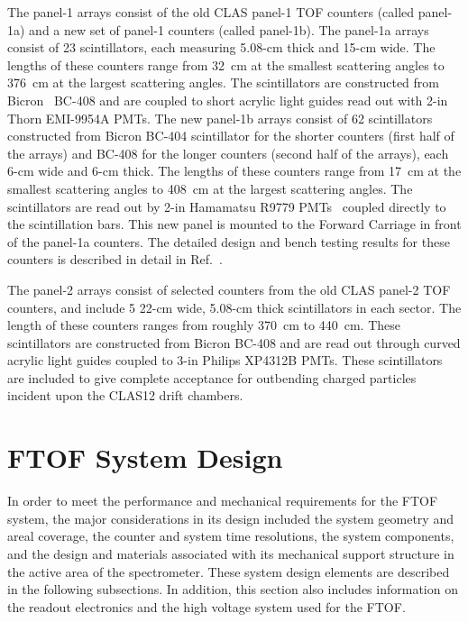 \documentclass{elsart}
\begin{document}
The panel-1 arrays consist of the old CLAS panel-1 TOF counters (called panel-1a) and a new set of panel-1
counters (called panel-1b).  The panel-1a arrays consist of 23 scintillators, each measuring 5.08-cm thick
and 15-cm wide.  The lengths of these counters range from 32~cm at the smallest scattering angles to
376~cm at the largest scattering angles.  The scintillators are constructed from Bicron~\cite{bicron}
BC-408 and are coupled to short acrylic light guides read out with 2-in Thorn EMI-9954A PMTs.  The new
panel-1b arrays consist of 62 scintillators constructed from Bicron BC-404 scintillator for the shorter
counters (first half of the arrays) and BC-408 for the longer counters (second half of the arrays), each
6-cm wide and 6-cm thick. The lengths of these counters range from 17~cm at the smallest scattering
angles to 408~cm at the largest scattering angles. The scintillators are read out by 2-in Hamamatsu R9779
PMTs~\cite{hamamatsu} coupled directly to the scintillation bars. This new panel is mounted to the Forward
Carriage in front of the panel-1a counters. The detailed design and bench testing results for these counters
is described in detail in Ref.~\cite{nim-p1b}.

The panel-2 arrays consist of selected counters from the old CLAS panel-2 TOF counters, and include 5
22-cm wide, 5.08-cm thick scintillators in each sector.  The length of these counters ranges from roughly
370~cm to 440~cm.  These scintillators are constructed from Bicron BC-408 and are read out through
curved acrylic light guides coupled to 3-in Philips XP4312B PMTs. These scintillators are included to give
complete acceptance for outbending charged particles incident upon the CLAS12 drift chambers.  

\section{FTOF System Design}
\label{sec:design}

In order to meet the performance and mechanical requirements for the FTOF system, the major
considerations in its design included the system geometry and areal coverage, the counter and system
time resolutions, the system components, and the design and materials associated with its mechanical
support structure in the active area of the spectrometer. These system design elements are described
in the following subsections. In addition, this section also includes information on the readout electronics
and the high voltage system used for the FTOF.
\end{document}
